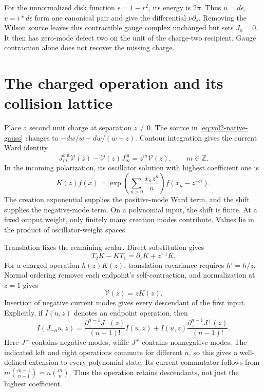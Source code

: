 For the unnormalized disk function \(\epsilon=1-r^2\), its energy is
\(2\pi\). Thus \(u=d\epsilon\), \(v=i*d\epsilon\) form one canonical
pair and give the differential \(\nu\partial_s\).
Removing the Wilson source leaves this contractible gauge complex
unchanged but sets \(J_0=0\). It then has zero-mode defect two on the
unit of the charge-two recipient. Gauge contraction alone does not
recover the missing charge.

\section{The charged operation and its collision lattice}

Place a second unit charge at separation \(z\ne0\).
The source in \eqref{eq:vol2-native-gauss} changes to
\(-dw/w-dw/(w-z)\). Contour integration gives the current Ward identity
\[
 J_m^{\mathrm{out}}\mathcal V(z)-\mathcal V(z)J_m^{\mathrm{in}}
       =z^m\mathcal V(z),\qquad m\in\mathbb Z.
\]
In the incoming polarization, its oscillator solution with highest
coefficient one is
\begin{equation}\label{eq:vol2-native-endpoint-kernel}
 K(z)f(x)=\exp\left(\sum_{n>0}\frac{x_nz^n}{n}\right)
                                      f(x_n-z^{-n}).
\end{equation}
The creation exponential supplies the positive-mode Ward term, and the
shift supplies the negative-mode term. On a polynomial input, the shift
is finite. At a fixed output weight, only finitely many creation modes
contribute. Values lie in the product of oscillator-weight spaces.

Translation fixes the remaining scalar. Direct substitution gives
\[
 T_2K-KT_1=\partial_zK+z^{-1}K.
\]
For a charged operation \(h(z)K(z)\), translation covariance requires
\(h'=h/z\). Normal ordering removes each endpoint's self-contraction,
and normalization at \(z=1\) gives
\begin{equation}\label{eq:vol2-native-charged-operation}
                         \mathcal V(z)=zK(z).
\end{equation}
Insertion of negative current modes gives every descendant of the first
input. Explicitly, if \(I(u,z)\) denotes an endpoint operation, then
\[
 I(J_{-n}u,z)=
 \frac{\partial_z^{n-1}J^-(z)}{(n-1)!}I(u,z)
 +I(u,z)\frac{\partial_z^{n-1}J^+(z)}{(n-1)!}.
\]
Here \(J^-\) contains negative modes, while \(J^+\) contains nonnegative
modes. The indicated left and right operations commute for different
\(n\), so this gives a well-defined extension to every polynomial state.
Its current commutator follows from
\(m\binom{m-1}{n-1}=n\binom mn\). Thus the operation retains descendants,
not just the highest coefficient.

